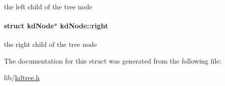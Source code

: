 the left child of the tree node \hypertarget{structkdNode_0bfb521a721369f5108b20e32aa6b100}{
\paragraph[right]{\setlength{\rightskip}{0pt plus 5cm}struct {\bf kdNode}$\ast$ {\bf kdNode::right}}\hfill}
\label{structkdNode_0bfb521a721369f5108b20e32aa6b100}


the right child of the tree node 

The documentation for this struct was generated from the following file:\begin{CompactItemize}
\item 
lib/\hyperlink{kdtree_8h}{kdtree.h}\end{CompactItemize}
